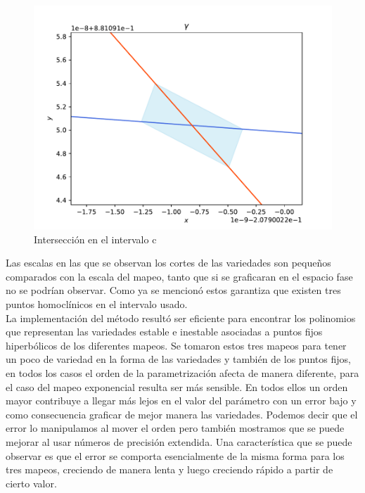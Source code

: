 \begin{figure}[H]
\centering
\includegraphics[scale=0.4]{cruce_c}
\caption{Intersección en el intervalo c}
\label{jung_corte3}
\end{figure}

Las escalas en las que se observan los cortes de las variedades son pequeños comparados con la escala del mapeo, tanto que si se graficaran en el espacio fase no se podrían observar. Como ya se mencionó estos garantiza que existen tres puntos homoclínicos en el intervalo usado. \\


La implementación del método resultó ser eficiente para encontrar los polinomios que representan las variedades estable e inestable asociadas a puntos fijos hiperbólicos de los diferentes mapeos. Se tomaron estos tres mapeos para tener un poco de variedad en la forma de las variedades y también de los puntos fijos, en todos los casos el orden de la parametrización afecta de manera diferente, para el caso del mapeo exponencial resulta ser más sensible. En todos ellos un orden mayor contribuye a llegar más lejos en el valor del parámetro con un error bajo y como consecuencia graficar de mejor manera las variedades. Podemos decir que el error lo manipulamos al mover el orden pero también mostramos que se puede mejorar al usar números de precisión extendida. Una característica que se puede observar es que el error se comporta esencialmente de la misma forma para los tres mapeos, creciendo de manera lenta y luego creciendo rápido a partir de cierto valor. \\


